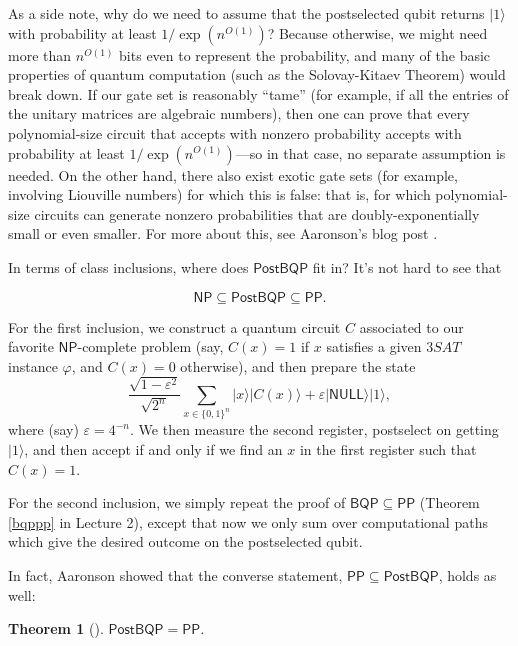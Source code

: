 \documentclass[11pt]{report}
\theoremstyle{plain}
\newtheorem{theorem}{Theorem}[section]
\theoremstyle{definition}
\renewcommand{\ket}[1]{|#1\rangle}
\begin{document}
As a side note, why do we need to assume that the postselected qubit returns
  $\ket{1}$ with probability at least $1/\exp(n^{O(1)})$?  Because otherwise, we might need more than $n^{O(1)}$ bits even to represent
  the probability, and many of the basic properties of quantum computation (such as the Solovay-Kitaev Theorem) would break down.
  If our gate set is reasonably ``tame'' (for example, if all the entries of the unitary matrices are algebraic numbers), then one can prove
  that every polynomial-size circuit that accepts with nonzero probability accepts with probability at least $1/\exp(n^{O(1)})$---so in that
  case, no separate assumption is needed.  On the other hand, there also exist exotic gate sets (for example, involving Liouville numbers) for which this is false: that is, for which polynomial-size circuits can generate nonzero probabilities that are doubly-exponentially small or even smaller. For more about this, see Aaronson's blog post \cite{Aar14}.

In terms of class inclusions, where does $\mathsf{PostBQP}$ fit in?  It's not hard to see that

$$ \mathsf{NP} \subseteq \mathsf{PostBQP} \subseteq \mathsf{PP}. $$

For the first inclusion, we construct a quantum circuit $C$ associated to our favorite $\mathsf{NP}$-complete problem (say, $C(x)=1$ if $x$ satisfies
a given $3SAT$ instance $\varphi$, and $C(x)=0$ otherwise), and then prepare the state
\begin{equation}
   \frac{\sqrt{1-\varepsilon^2}}{\sqrt{2^n}} \sum_{x \in \{0,1\}^n} \ket{x} \ket{ C ( x) } + \varepsilon
  \ket{ \mathsf{NULL} } \ket{1},
\end{equation}
where (say) $\varepsilon = 4^{-n}$.  We then measure the second register, postselect on getting $\ket{1}$, and then accept if and only if we find an $x$ in the first register such that $C(x)=1$.

For the second inclusion, we simply repeat the proof of $\mathsf{BQP} \subseteq \mathsf{PP}$ (Theorem \ref{bqppp} in Lecture 2), except that now we only sum over computational paths which give the desired outcome on the postselected qubit.

In fact, Aaronson \cite{aar:pp} showed that the converse statement, $\mathsf{PP}\subseteq \mathsf{PostBQP}$, holds as well:
\begin{theorem}[\cite{aar:pp}]
\label{postbqppp}
  $\mathsf{PostBQP}=\mathsf{PP}$.
\end{theorem}
\end{document}
